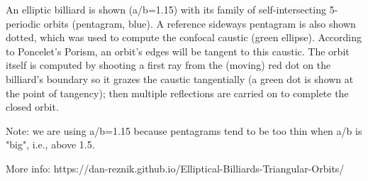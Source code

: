 An elliptic billiard is shown (a/b=1.15) with its family of self-intersecting 5-periodic orbits (pentagram, blue). A reference sideways pentagram is also shown dotted, which was used to compute the confocal caustic (green ellipse). According to Poncelet's Porism, an orbit's edges will be tangent to this caustic. The orbit itself is computed by shooting a first ray from the (moving) red dot on the billiard's boundary so it grazes the caustic tangentially (a green dot is shown at the point of tangency); then multiple reflections are carried on to complete the closed orbit. 

Note: we are using a/b=1.15 because pentagrams tend to be too thin when a/b is "big", i.e., above 1.5.

More info: https://dan-reznik.github.io/Elliptical-Billiards-Triangular-Orbits/